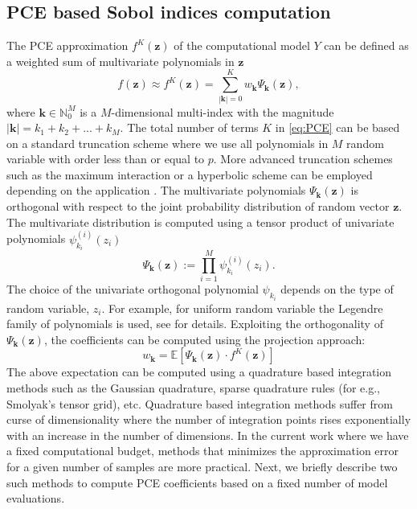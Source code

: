 \documentclass[review]{elsarticle}
\numberwithin{equation}{section}
\numberwithin{equation}{section}
\begin{document}
\subsection{PCE based Sobol indices computation}
The PCE approximation $f^{K}(\mathbf{z})$ of the computational model $Y$ can be defined as a weighted sum of multivariate polynomials in $\mathbf{z}$ \cite{RSmith}
\begin{equation}\label{eq:PCE}
f(\mathbf{z}) \approx f^{K}(\mathbf{z}) = \sum_{|\mathbf{k}| = 0}^K w_{\mathbf{k}}\Psi_{\mathbf{k}}(\mathbf{z}),
\end{equation}
where $\mathbf{k}\in \mathbb{N}_0^M$ is a $M$-dimensional multi-index with the magnitude $|\mathbf{k}| = k_1+k_2 + ... + k_M$. The total number of terms $K$ in \eqref{eq:PCE} can be based on a standard truncation scheme where we use all polynomials in $M$ random variable with order less than or equal to $p$. More advanced truncation schemes such as the maximum interaction or a hyperbolic scheme can be employed depending on the application \cite{BlatmanThesis}. The multivariate polynomials $\Psi_{\mathbf{k}}(\mathbf{z})$ is orthogonal with respect to the joint probability distribution of random vector $\mathbf{z}$. The multivariate distribution is computed using a tensor product of univariate polynomials $\psi_{k_i}^{(i)}(z_i)$
\begin{equation}
\Psi_{\mathbf{k}}(\mathbf{z}) := \prod_{i=1}^M\psi_{k_i}^{(i)}(z_i).
\end{equation}
The choice of the univariate orthogonal polynomial $\psi_{k_i}$ depends on the type of random variable, $z_i$. For example, for uniform random variable the Legendre family of polynomials is used, see \cite{Xiu2002} for details. Exploiting the orthogonality of $\Psi_{\mathbf{k}}(\mathbf{z})$, the coefficients can be computed using the projection approach:
\begin{equation}\label{eq:projection}
w_{\mathbf{k}} = \mathbb{E}[\Psi_{\mathbf{k}}(\mathbf{z})\cdot f^{K}(\mathbf{z})]
\end{equation} 
The above expectation can be computed using a quadrature based integration methods such as the Gaussian quadrature, sparse quadrature rules (for e.g., Smolyak's tensor grid), etc. Quadrature based integration methods suffer from curse of dimensionality where the number of integration points rises exponentially with an increase in the number of dimensions. In the current work where we have a fixed computational budget, methods that minimizes the approximation error for a given number of samples are more practical. Next, we briefly describe two such methods to compute PCE coefficients based on a fixed number of model evaluations.
\end{document}
